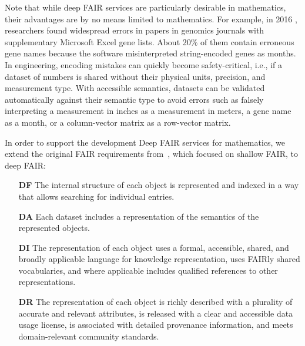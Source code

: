 Note that while deep FAIR services are particularly desirable in mathematics, their advantages are by no means limited to mathematics.
For example, in 2016 \cite{ZieEreElO:GeneErrors16}, researchers found widespread errors in papers in genomics journals with supplementary Microsoft Excel gene lists. 
About 20\% of them contain erroneous gene names because the software misinterpreted string-encoded genes as months.
In engineering, encoding mistakes can quickly become safety-critical, i.e., if a dataset of numbers is shared without their physical units, precision, and measurement type.
With accessible semantics, datasets can be validated automatically against their semantic type to avoid errors such as falsely interpreting a measurement in inches as a measurement in meters, a gene name as a month, or a column-vector matrix as a row-vector matrix.


In order to support the development Deep FAIR services for mathematics, we extend the original FAIR requirements from~\cite{WilDumAal:FAIR16}, which focused on shallow FAIR, to deep FAIR:
\begin{enumerate}
  \item[\textbf{DF}] The internal structure of each object is represented and indexed in a way that allows searching for individual entries.
  \item[\textbf{DA}] Each dataset includes a representation of the semantics of the represented objects.
  \item[\textbf{DI}] The representation of each object uses a formal, accessible, shared, and broadly applicable language for knowledge representation, uses FAIRly shared vocabularies, and where applicable includes qualified references to other representations.
  \item[\textbf{DR}] The representation of each object is richly described with a plurality of accurate and relevant attributes, is released with a clear and accessible data usage license, is associated with detailed provenance information, and meets domain-relevant community standards.
\end{enumerate}


